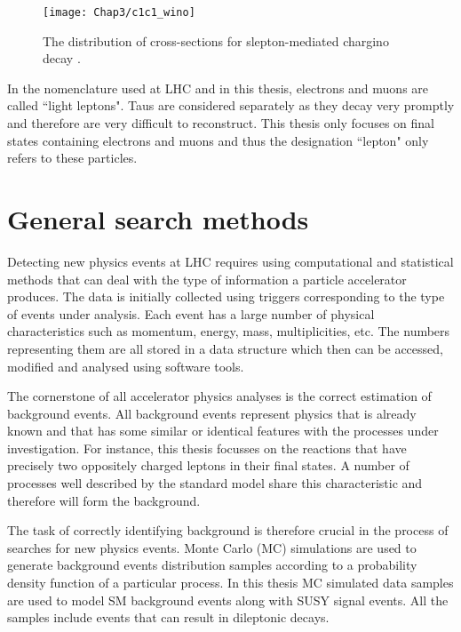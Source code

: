 \begin{figure}[!h]
\centering
 \captionsetup{width=0.8\textwidth}
	\texttt{[image: Chap3/c1c1\_wino]}
	\caption{The distribution of cross-sections for slepton-mediated chargino decay \citep{xsec}.}
	\label{fig:xsec}
\end{figure}

In the nomenclature used at LHC and in this thesis, electrons and muons are called ``light leptons". Taus are considered separately as they decay very promptly and therefore are very difficult to reconstruct. This thesis only focuses on final states containing electrons and muons and thus the designation ``lepton" only refers to these particles.  

 


\section{General search methods}
Detecting new physics events at LHC requires using computational and statistical methods that can deal with the type of information a particle accelerator produces. The data is initially collected using triggers corresponding to the type of events under analysis. Each event has a large number of physical characteristics such as momentum, energy, mass, multiplicities, etc. The numbers representing them are all stored in a data structure which then can be accessed, modified and analysed using software tools. 

The cornerstone of all accelerator physics analyses is the correct estimation of background events. All background events represent physics that is already known and that has some similar or identical features with the processes under investigation. For instance, this thesis focusses on the reactions that have precisely two oppositely charged leptons in their final states. A number of processes well described by the standard model share this characteristic and therefore will form the background. 

The task of correctly identifying background is therefore crucial in the process of searches for new physics events. Monte Carlo (MC) simulations are used to generate background events distribution samples according to a probability density function of a particular process. In this thesis MC simulated data samples are used to model SM background events along with SUSY signal events. All the samples include events that can result in dileptonic decays. 

